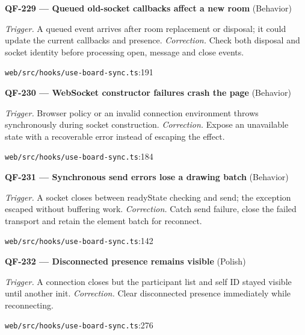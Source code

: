\begin{minipage}{\linewidth}
\textbf{QF-229 --- Queued old-socket callbacks affect a new room} {\scriptsize\color{accent}(Behavior)}\par
\textit{Trigger.} A queued event arrives after room replacement or disposal; it could update the current callbacks and presence. \textit{Correction.} Check both disposal and socket identity before processing open, message and close events.\par
{\scriptsize\color{muted}\nolinkurl{web/src/hooks/use-board-sync.ts}:191}\par
\end{minipage}\par\vspace{7pt}
\begin{minipage}{\linewidth}
\textbf{QF-230 --- WebSocket constructor failures crash the page} {\scriptsize\color{accent}(Behavior)}\par
\textit{Trigger.} Browser policy or an invalid connection environment throws synchronously during socket construction. \textit{Correction.} Expose an unavailable state with a recoverable error instead of escaping the effect.\par
{\scriptsize\color{muted}\nolinkurl{web/src/hooks/use-board-sync.ts}:184}\par
\end{minipage}\par\vspace{7pt}
\begin{minipage}{\linewidth}
\textbf{QF-231 --- Synchronous send errors lose a drawing batch} {\scriptsize\color{accent}(Behavior)}\par
\textit{Trigger.} A socket closes between readyState checking and send; the exception escaped without buffering work. \textit{Correction.} Catch send failure, close the failed transport and retain the element batch for reconnect.\par
{\scriptsize\color{muted}\nolinkurl{web/src/hooks/use-board-sync.ts}:142}\par
\end{minipage}\par\vspace{7pt}
\begin{minipage}{\linewidth}
\textbf{QF-232 --- Disconnected presence remains visible} {\scriptsize\color{accent}(Polish)}\par
\textit{Trigger.} A connection closes but the participant list and self ID stayed visible until another init. \textit{Correction.} Clear disconnected presence immediately while reconnecting.\par
{\scriptsize\color{muted}\nolinkurl{web/src/hooks/use-board-sync.ts}:276}\par
\end{minipage}\par\vspace{7pt}

